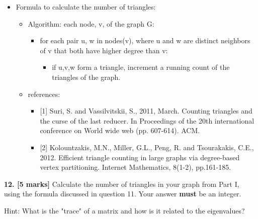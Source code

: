 \documentclass[11pt]{article}
\providecommand{\tightlist}{%
      \setlength{\itemsep}{0pt}\setlength{\parskip}{0pt}}
\begin{document}
\begin{itemize}
\item
  Formula to calculate the number of triangles:

  \begin{itemize}
  \tightlist
  \item
    Algorithm: each node, v, of the graph G:

    \begin{itemize}
    \tightlist
    \item
      for each pair u, w in nodes(v), where u and w are distinct
      neighbors of v that both have higher degree than v:

      \begin{itemize}
      \tightlist
      \item
        if u,v,w form a triangle, increment a running count of the
        triangles of the graph.
      \end{itemize}
    \end{itemize}
  \item
    references:

    \begin{itemize}
    \tightlist
    \item
      {[}1{]} Suri, S. and Vassilvitskii, S., 2011, March. Counting
      triangles and the curse of the last reducer. In Proceedings of the
      20th international conference on World wide web (pp. 607-614).
      ACM.
    \item
      {[}2{]} Kolountzakis, M.N., Miller, G.L., Peng, R. and
      Tsourakakis, C.E., 2012. Efficient triangle counting in large
      graphs via degree-based vertex partitioning. Internet Mathematics,
      8(1-2), pp.161-185.
    \end{itemize}
  \end{itemize}
\end{itemize}

    \textbf{12. {[}5 marks{]}} Calculate the number of triangles in your
graph from Part I, using the formula discussed in question 11. Your
answer \textbf{must} be an integer.

Hint: What is the "trace" of a matrix and how is it related to the
eigenvalues?
\end{document}
